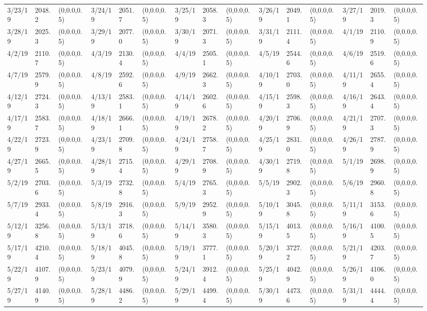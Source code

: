 \documentclass[12pt]{article}
\begin{document}
\begin{table}
\begin{center}
\begin{tabular}{p{15pt}p{15pt}p{25pt}p{15pt}p{15pt}p{25pt}p{15pt}p{15pt}p{25pt}p{15pt}p{15pt}p{25pt}p{15pt}p{15pt}p{25pt}}
        3/23/19&2048.2&(0,0.0,0.5)&3/24/19&2051.7&(0,0.0,0.5)&3/25/19&2058.3&(0,0.0,0.5)&3/26/19&2049.1&(0,0.0,0.5)&3/27/19&2019.3&(0,0.0,0.5)\\
        3/28/19&2025.3&(0,0.0,0.5)&3/29/19&2077.0&(0,0.0,0.5)&3/30/19&2071.3&(0,0.0,0.5)&3/31/19&2111.4&(0,0.0,0.5)&4/1/19&2110.9&(0,0.0,0.5)\\
        4/2/19&2110.7&(0,0.0,0.5)&4/3/19&2130.4&(0,0.0,0.5)&4/4/19&2505.1&(0,0.0,0.5)&4/5/19&2544.6&(0,0.0,0.5)&4/6/19&2519.6&(0,0.0,0.5)\\
        4/7/19&2579.9&(0,0.0,0.5)&4/8/19&2592.6&(0,0.0,0.5)&4/9/19&2662.3&(0,0.0,0.5)&4/10/19&2703.0&(0,0.0,0.5)&4/11/19&2655.4&(0,0.0,0.5)\\
        4/12/19&2724.3&(0,0.0,0.5)&4/13/19&2583.1&(0,0.0,0.5)&4/14/19&2602.6&(0,0.0,0.5)&4/15/19&2598.3&(0,0.0,0.5)&4/16/19&2643.4&(0,0.0,0.5)\\
        4/17/19&2583.7&(0,0.0,0.5)&4/18/19&2666.1&(0,0.0,0.5)&4/19/19&2678.2&(0,0.0,0.5)&4/20/19&2706.9&(0,0.0,0.5)&4/21/19&2707.3&(0,0.0,0.5)\\
        4/22/19&2723.9&(0,0.0,0.5)&4/23/19&2709.8&(0,0.0,0.5)&4/24/19&2758.7&(0,0.0,0.5)&4/25/19&2831.0&(0,0.0,0.5)&4/26/19&2787.9&(0,0.0,0.5)\\
        4/27/19&2665.5&(0,0.0,0.5)&4/28/19&2715.4&(0,0.0,0.5)&4/29/19&2708.9&(0,0.0,0.5)&4/30/19&2719.8&(0,0.0,0.5)&5/1/19&2698.9&(0,0.0,0.5)\\
        5/2/19&2703.6&(0,0.0,0.5)&5/3/19&2732.8&(0,0.0,0.5)&5/4/19&2765.3&(0,0.0,0.5)&5/5/19&2902.3&(0,0.0,0.5)&5/6/19&2960.8&(0,0.0,0.5)\\
        5/7/19&2933.4&(0,0.0,0.5)&5/8/19&2916.3&(0,0.0,0.5)&5/9/19&2952.9&(0,0.0,0.5)&5/10/19&3045.8&(0,0.0,0.5)&5/11/19&3153.6&(0,0.0,0.5)\\
        5/12/19&3256.8&(0,0.0,0.5)&5/13/19&3718.6&(0,0.0,0.5)&5/14/19&3580.3&(0,0.0,0.5)&5/15/19&4013.5&(0,0.0,0.5)&5/16/19&4100.5&(0,0.0,0.5)\\
        5/17/19&4210.4&(0,0.0,0.5)&5/18/19&4045.8&(0,0.0,0.5)&5/19/19&3777.1&(0,0.0,0.5)&5/20/19&3727.2&(0,0.0,0.5)&5/21/19&4203.7&(0,0.0,0.5)\\
        5/22/19&4107.9&(0,0.0,0.5)&5/23/19&4079.9&(0,0.0,0.5)&5/24/19&3912.4&(0,0.0,0.5)&5/25/19&4042.9&(0,0.0,0.5)&5/26/19&4106.0&(0,0.0,0.5)\\
        5/27/19&4140.9&(0,0.0,0.5)&5/28/19&4486.2&(0,0.0,0.5)&5/29/19&4499.4&(0,0.0,0.5)&5/30/19&4473.6&(0,0.0,0.5)&5/31/19&4444.4&(0,0.0,0.5)\\
        \bottomrule 
        \end{tabular}
        \end{center}
        \end{table}
\end{document}
